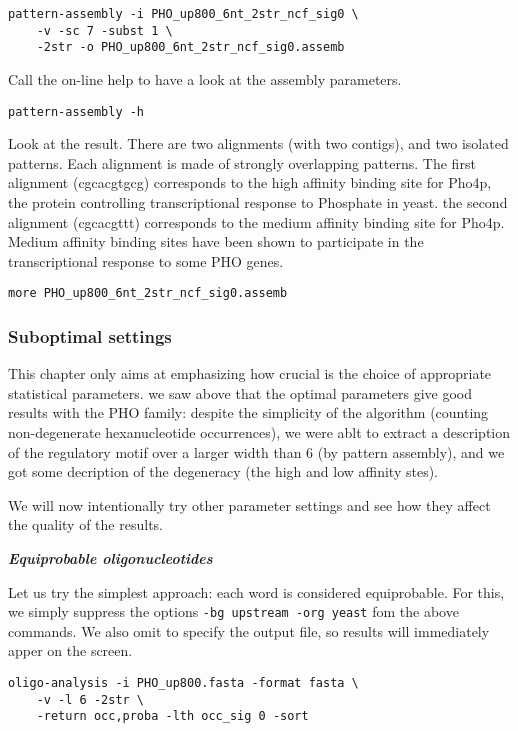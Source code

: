 \begin{verbatim}
pattern-assembly -i PHO_up800_6nt_2str_ncf_sig0 \
    -v -sc 7 -subst 1 \
    -2str -o PHO_up800_6nt_2str_ncf_sig0.assemb
\end{verbatim}


Call the on-line help to have a look at the assembly parameters. 
\begin{verbatim}
pattern-assembly -h
\end{verbatim}

Look at the result. There are two alignments (with two contigs), and
two isolated patterns. Each alignment is made of strongly overlapping
patterns. The first alignment (cgcacgtgcg) corresponds to the high
affinity binding site for Pho4p, the protein controlling
transcriptional response to Phosphate in yeast. the second alignment
(cgcacgttt) corresponds to the medium affinity binding site for
Pho4p. Medium affinity binding sites have been shown to participate in
the transcriptional response to some PHO genes.

\begin{verbatim}
more PHO_up800_6nt_2str_ncf_sig0.assemb
\end{verbatim}

\subsubsection{Suboptimal settings}

This chapter only aims at emphasizing how crucial is the choice of
appropriate statistical parameters. we saw above that the optimal
parameters give good results with the PHO family: despite the
simplicity of the algorithm (counting non-degenerate hexanucleotide
occurrences), we were ablt to extract a description of the regulatory
motif over a larger width than 6 (by pattern assembly), and we got
some decription of the degeneracy (the high and low affinity stes).

We will now intentionally try other parameter settings and see how
they affect the quality of the results.

\textit{\textbf{Equiprobable oligonucleotides}}

Let us try the simplest approach: each word is considered
equiprobable. For this, we simply suppress the options
\texttt{-bg upstream -org yeast} fom the above commands. We
also omit to specify the output file, so results will immediately
apper on the screen.

\begin{verbatim} 
oligo-analysis -i PHO_up800.fasta -format fasta \ 
    -v -l 6 -2str \
    -return occ,proba -lth occ_sig 0 -sort 
\end{verbatim}

